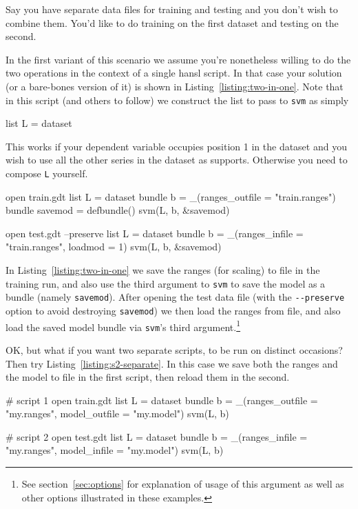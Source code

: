 \documentclass{article}
\begin{document}
Say you have separate data files for training and testing and you
don't wish to combine them. You'd like to do training on the first
dataset and testing on the second.

In the first variant of this scenario we assume you're nonetheless
willing to do the two operations in the context of a single hansl
script. In that case your solution (or a bare-bones version of it) is
shown in Listing~\ref{listing:two-in-one}. Note that in this script
(and others to follow) we construct the list to pass to \texttt{svm}
as simply
\begin{code}
list L = dataset
\end{code}
This works if your dependent variable occupies position 1 in the
dataset and you wish to use all the other series in the dataset as
supports. Otherwise you need to compose \texttt{L} yourself.

\begin{script}[htbp]
  \caption{Scenario 2: using two data files in one script}
  \label{listing:two-in-one}
\begin{scode}
open train.gdt
list L = dataset
bundle b = _(ranges_outfile = "train.ranges")
bundle savemod = defbundle()
svm(L, b, &savemod)

open test.gdt --preserve
list L = dataset
bundle b = _(ranges_infile = "train.ranges", loadmod = 1)
svm(L, b, &savemod)
\end{scode}
\end{script}

In Listing~\ref{listing:two-in-one} we save the ranges (for scaling)
to file in the training run, and also use the third argument to
\texttt{svm} to save the model as a bundle (namely
\texttt{savemod}). After opening the test data file (with the
\verb|--preserve| option to avoid destroying \texttt{savemod}) we then
load the ranges from file, and also load the saved model bundle via
\texttt{svm}'s third argument.\footnote{See section~\ref{sec:options}
  for explanation of usage of this argument as well as other options
  illustrated in these examples.}

OK, but what if you want two separate scripts, to be run on distinct
occasions? Then try Listing~\ref{listing:s2-separate}. In this case we
save both the ranges and the model to file in the first script, then
reload them in the second.

\begin{script}[htbp]
  \caption{Scenario 2: using two separate scripts}
  \label{listing:s2-separate}
\begin{scode}
# script 1
open train.gdt
list L = dataset
bundle b = _(ranges_outfile = "my.ranges", model_outfile = "my.model")
svm(L, b)

# script 2
open test.gdt
list L = dataset
bundle b = _(ranges_infile = "my.ranges", model_infile = "my.model")
svm(L, b)
\end{scode}
\end{script}
\end{document}
